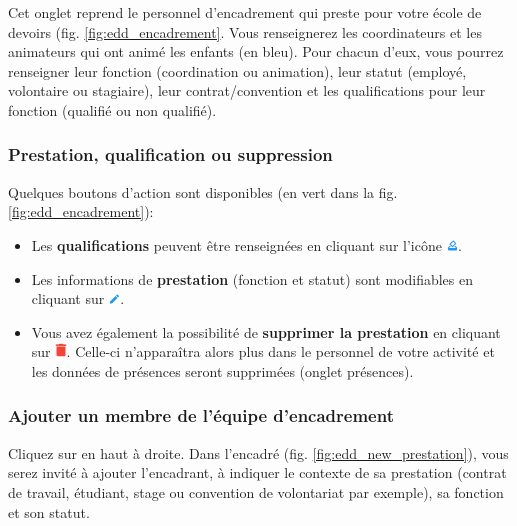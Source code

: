 Cet onglet reprend le personnel d'encadrement qui preste pour votre école de devoirs (fig. \ref{fig:edd_encadrement}. Vous renseignerez les coordinateurs et les animateurs qui ont animé les enfants (en \textcolor{bleu}{bleu}). Pour chacun d'eux, vous pourrez renseigner leur fonction (coordination ou animation), leur statut (employé, volontaire ou stagiaire), leur contrat/convention et les qualifications pour leur fonction (qualifié ou non qualifié).

\subsubsection{Prestation, qualification ou suppression}
Quelques boutons d'action sont disponibles (en \textcolor{vert}{vert} dans la fig. \ref{fig:edd_encadrement}):


\begin{itemize}
    \item Les \textbf{qualifications} peuvent être renseignées en cliquant sur l'icône \includegraphics[width=0.3cm]{Images/icon/button_dmd_qualif.png}.
    \item Les informations de \textbf{prestation} (fonction et statut) sont modifiables en cliquant sur \includegraphics[width=0.3cm]{Images/icon/button_modif.png}.
    \item Vous avez également la possibilité de \textbf{supprimer la prestation} en cliquant sur \includegraphics[width=0.3cm]{Images/icon/button_poubelle.png}. Celle-ci n'apparaîtra alors plus dans le personnel de votre activité et les données de présences seront supprimées (onglet présences).
\end{itemize} 




\subsubsection{Ajouter un membre de l'équipe d'encadrement}
Cliquez sur  en haut à droite. Dans l'encadré  (fig. \ref{fig:edd_new_prestation}), vous serez invité à ajouter l'encadrant, à indiquer le contexte de sa prestation (contrat de travail, étudiant, stage ou convention de volontariat par exemple), sa fonction et son statut. 

